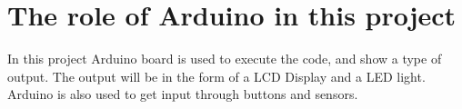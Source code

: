 \section{The role of Arduino in this project}

In this project Arduino board is used to execute the code, and show a type of output. The output will be in the form of a LCD Display and a LED light. 
Arduino is also used to get input through buttons and sensors. 

